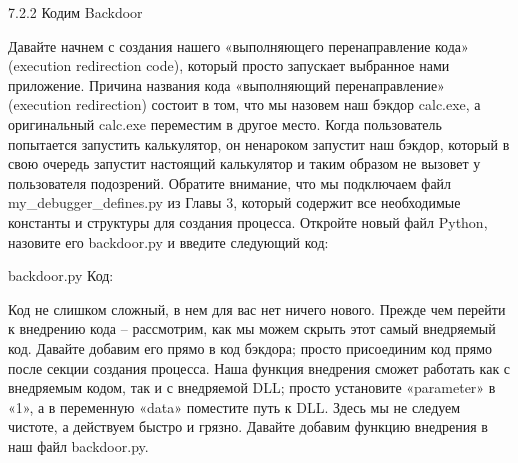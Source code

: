 \documentclass[12pt, a4paper, oneside]{book}
\begin{document}
7.2.2 Кодим Backdoor

Давайте начнем с создания нашего «выполняющего перенаправление кода» (execution redirection code), который просто запускает выбранное нами приложение. Причина названия кода «выполняющий перенаправление» (execution redirection) состоит в том, что мы назовем наш бэкдор calc.exe, а оригинальный calc.exe переместим в другое место. Когда пользователь попытается запустить калькулятор, он ненароком запустит наш бэкдор, который в свою очередь запустит настоящий калькулятор и таким образом не вызовет у пользователя подозрений. Обратите внимание, что мы подключаем файл my\_debugger\_defines.py из Главы 3, который содержит все необходимые константы и структуры для создания процесса. Откройте новый файл Python, назовите его backdoor.py и введите следующий код:

backdoor.py
Код:







Код не слишком сложный, в нем для вас нет ничего нового. Прежде чем перейти к внедрению кода – рассмотрим, как мы можем скрыть этот самый внедряемый код. Давайте добавим его прямо в код бэкдора; просто присоединим код прямо после секции создания процесса. Наша функция внедрения сможет работать как с внедряемым кодом, так и с внедряемой DLL; просто установите «parameter» в «1», а в переменную «data» поместите путь к DLL. Здесь мы не следуем чистоте, а действуем быстро и грязно. Давайте добавим функцию внедрения в наш файл backdoor.py.
\end{document}
